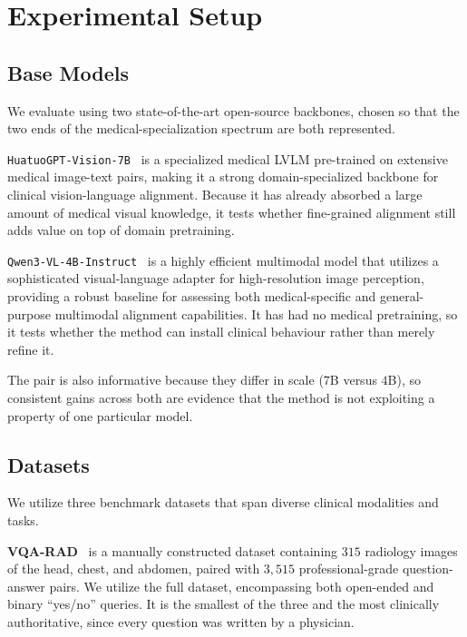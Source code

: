 \section{Experimental Setup}
\label{section:setup}

\subsection{Base Models}
\label{sec:exp:models}

We evaluate \ourloss{} using two state-of-the-art open-source backbones, chosen so that the two ends of the medical-specialization spectrum are both represented.

\texttt{HuatuoGPT-Vision-7B}~\cite{chen2024towards} is a specialized medical LVLM pre-trained on extensive medical image-text pairs, making it a strong domain-specialized backbone for clinical vision-language alignment. Because it has already absorbed a large amount of medical visual knowledge, it tests whether fine-grained alignment still adds value on top of domain pretraining.

\texttt{Qwen3-VL-4B-Instruct}~\cite{bai2025qwen3} is a highly efficient multimodal model that utilizes a sophisticated visual-language adapter for high-resolution image perception, providing a robust baseline for assessing both medical-specific and general-purpose multimodal alignment capabilities. It has had no medical pretraining, so it tests whether the method can install clinical behaviour rather than merely refine it.

The pair is also informative because they differ in scale ($7$B versus $4$B), so consistent gains across both are evidence that the method is not exploiting a property of one particular model.

\subsection{Datasets}
\label{sec:exp:datasets}

We utilize three benchmark datasets that span diverse clinical modalities and tasks.

\textbf{VQA-RAD}~\cite{lau2018dataset} is a manually constructed dataset containing $315$ radiology images of the head, chest, and abdomen, paired with $3{,}515$ professional-grade question-answer pairs. We utilize the full dataset, encompassing both open-ended and binary ``yes/no'' queries. It is the smallest of the three and the most clinically authoritative, since every question was written by a physician.

